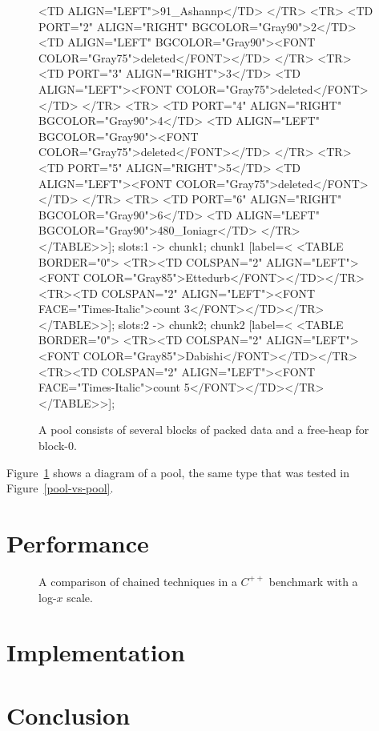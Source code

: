 \documentclass[12pt]{article}
\begin{document}
\begin{figure}
{		<TD ALIGN="LEFT">91_Ashannp</TD>
	</TR>
	<TR>
		<TD PORT="2" ALIGN="RIGHT" BGCOLOR="Gray90">2</TD>
		<TD ALIGN="LEFT" BGCOLOR="Gray90"><FONT COLOR="Gray75">deleted</FONT></TD>
	</TR>
	<TR>
		<TD PORT="3" ALIGN="RIGHT">3</TD>
		<TD ALIGN="LEFT"><FONT COLOR="Gray75">deleted</FONT></TD>
	</TR>
	<TR>
		<TD PORT="4" ALIGN="RIGHT" BGCOLOR="Gray90">4</TD>
		<TD ALIGN="LEFT" BGCOLOR="Gray90"><FONT COLOR="Gray75">deleted</FONT></TD>
	</TR>
	<TR>
		<TD PORT="5" ALIGN="RIGHT">5</TD>
		<TD ALIGN="LEFT"><FONT COLOR="Gray75">deleted</FONT></TD>
	</TR>
	<TR>
		<TD PORT="6" ALIGN="RIGHT" BGCOLOR="Gray90">6</TD>
		<TD ALIGN="LEFT" BGCOLOR="Gray90">480_Ioniagr</TD>
	</TR>
</TABLE>>];
	slots:1 -> chunk1;
	chunk1 [label=<
<TABLE BORDER="0">
	<TR><TD COLSPAN="2" ALIGN="LEFT"><FONT COLOR="Gray85">Ettedurb</FONT></TD></TR>
	<TR><TD COLSPAN="2" ALIGN="LEFT"><FONT FACE="Times-Italic">count 3</FONT></TD></TR>
</TABLE>>];
	slots:2 -> chunk2;
	chunk2 [label=<
<TABLE BORDER="0">
	<TR><TD COLSPAN="2" ALIGN="LEFT"><FONT COLOR="Gray85">Dabishi</FONT></TD></TR>
	<TR><TD COLSPAN="2" ALIGN="LEFT"><FONT FACE="Times-Italic">count 5</FONT></TD></TR>
</TABLE>>];
	}
	\caption{A pool consists of several blocks of packed data and a free-heap for block-0.}
	\label{pool}
\end{figure}

Figure~\ref{pool} shows a diagram of a pool, the same type that was tested in Figure~\ref{pool-vs-pool}.

\section{Performance}

\begin{figure}%
\centering%
\caption{A comparison of chained techniques in a $C^{++}$ benchmark with a log-$x$ scale.}%
\label{timing}%
\end{figure}%

\section{Implementation}

\section{Conclusion}



\end{document}

